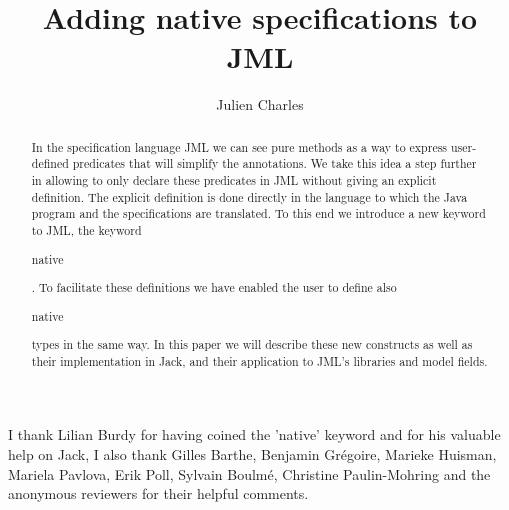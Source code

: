 \documentclass{llncs}
\newcommand{\code}[1]{\begin{tt}\begin{small}#1\end{small}\end{tt}}
\begin{document}
%
%
\pagestyle{headings}  %


%
\title{Adding native specifications to JML}

\author{Julien Charles }


\maketitle

\begin{abstract}
In the specification language JML we can see pure methods as a way to 
express user-defined predicates that will simplify the annotations. 
We take this idea a step further in allowing 
to only declare these predicates in JML without giving an explicit definition.
The explicit definition is done directly in the language
to which the Java program and the specifications are 
translated. To this end we introduce a new keyword to JML, the keyword 
\code{native}. 
To facilitate these definitions we have enabled the user to define 
also \code{native} types in the same way.
In this paper we will describe these new constructs as well as their 
implementation in Jack, 
 and their application to JML's libraries and model fields.
\end{abstract}
%







\begin{small}
\begin{it}
 I thank Lilian Burdy for having coined the 'native'
 keyword and for his valuable help on Jack, 
I also thank Gilles Barthe, Benjamin Gr\'egoire, Marieke Huisman, 
Mariela Pavlova, Erik Poll,
Sylvain Boulm\'e,  Christine Paulin-Mohring and the anonymous
reviewers for their helpful comments.
\end{it}
\end{small} 
%
%


\end{document}
